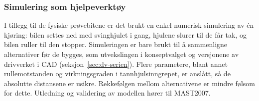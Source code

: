 \subsubsection{Simulering som hjelpeverktøy}
\label{sec:simulering-verktoy}
I tillegg til de fysiske prøvebitene er det brukt en enkel numerisk simulering av én kjøring: bilen settes ned med svinghjulet i gang, hjulene slurer til de får tak, og bilen ruller til den stopper. Simuleringen er bare brukt til å sammenligne alternativer før de bygges, som utvekslingen i konseptvalget og versjonene av drivverket i CAD (seksjon~\ref{sec:dv-serien}). Flere parametere, blant annet rullemotstanden og virkningsgraden i tannhjulsinngrepet, er anslått, så de absolutte distansene er usikre. Rekkefølgen mellom alternativene er mindre følsom for dette. Utledning og validering av modellen hører til MAST2007.
